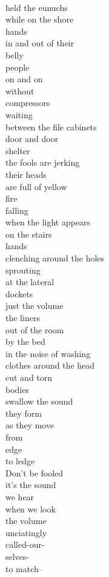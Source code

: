 \documentclass[smalldemyvopaper,11pt,twoside,onecolumn,openright,extrafontsizes]{memoir}
\begin{document}
\\held the eunuchs
\\while on the shore
\\hands
\\in and out of their
\\belly
\\people
\\on and on
\\without
\\compressors
\\waiting
\\between the file cabinets
\\door and door
\\shelter
\\the fools are jerking
\\their heads
\\are full of yellow
\\fire
\\falling
\\when the light appears
\\on the stairs
\\hands
\\clenching around the holes
\\sprouting
\\at the lateral
\\dockets
\\just the volume
\\the liners
\\out of the room
\\by the bed
\\in the noise of washing
\\clothes around the head
\\cut and torn
\\bodies
\\swallow the sound
\\they form
\\as they move
\\from
\\edge
\\to ledge
\\Don't be fooled
\\it's the sound
\\we hear
\\when we look
\\the volume
\\unciatingly
\\called-our-
\\selves-
\\to match--
\end{document}
